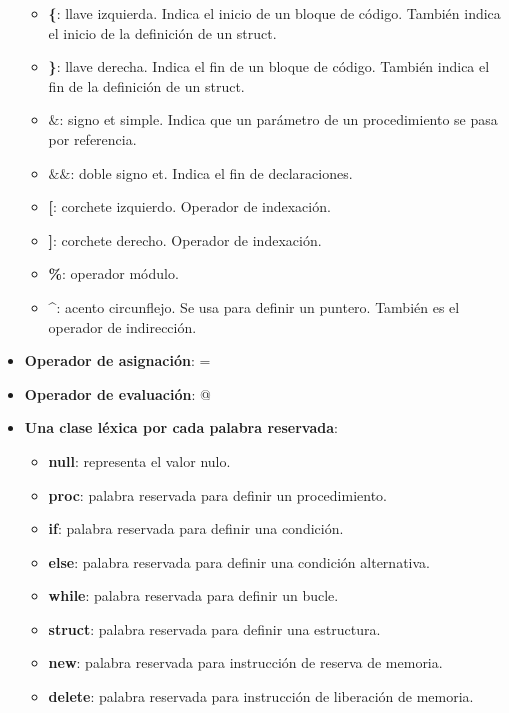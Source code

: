 \documentclass[11pt]{article}
\begin{document}
\begin{itemize}
\begin{itemize}
                \item \textbf{\{}: llave izquierda. Indica el inicio de un bloque de código. También indica el inicio de la definición de un struct.
                \item \textbf{\}}: llave derecha. Indica el fin de un bloque de código. También indica el fin de la definición de un struct.
                \item \textbf{$\&$}: signo et simple. Indica que un parámetro de un procedimiento se pasa por referencia.
                \item \textbf{$\&\&$}: doble signo et. Indica el fin de declaraciones.
                \item \textbf{[}: corchete izquierdo. Operador de indexación.
                \item \textbf{]}: corchete derecho. Operador de indexación.
                \item \textbf{\%}: operador módulo.
                \item \textbf{\^{}}: acento circunflejo. Se usa para definir un puntero. También es el operador de indirección.
            \end{itemize}
            \item \textbf{Operador de asignación}: =
            \item \textbf{Operador de evaluación}: @
            \item \textbf{Una clase léxica por cada palabra reservada}:
                \begin{itemize}
                    \item \textbf{null}: representa el valor nulo.
                    \item \textbf{proc}: palabra reservada para definir un procedimiento.
                    \item \textbf{if}: palabra reservada para definir una condición.
                    \item \textbf{else}: palabra reservada para definir una condición alternativa.
                    \item \textbf{while}: palabra reservada para definir un bucle.
                    \item \textbf{struct}: palabra reservada para definir una estructura.
                    \item \textbf{new}: palabra reservada para instrucción de reserva de memoria.
                    \item \textbf{delete}: palabra reservada para instrucción de liberación de memoria.

\end{itemize}
\end{itemize}
\end{document}
